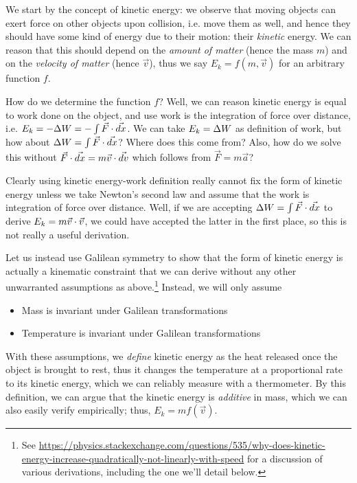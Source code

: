 \documentclass[12pt]{article}
\numberwithin{equation}{section}
\begin{document}
We start by the concept of kinetic energy: we observe that moving objects can exert force on other objects upon collision, i.e. move them as well, and hence they should have some kind of energy due to their motion: their \emph{kinetic} energy. We can reason that this should depend on the \emph{amount of matter} (hence the mass $m$) and on the \emph{velocity of matter} (hence $\vec{v}$), thus we say $E_k=f(m,\vec v)$ for an arbitrary function $f$.

How do we determine the function $f$? Well, we can reason kinetic energy is equal to work done on the object, and use work is the integration of force over distance, i.e. $E_k=-\De W=-\int\vec{F}\.\vec{dx}$. We can take $E_k=\De W$ as definition of work, but how about $\De W=\int\vec{F}\.\vec{dx}$? Where does this come from? Also, how do we solve this without $\vec{F}\.\vec{dx}=m\vec{v}\.\vec{dv}$ which follows from $\vec{F}=m\vec{a}$? 

Clearly using kinetic energy-work definition really cannot fix the form of kinetic energy unless we take Newton's second law and assume that the work is integration of force over distance. Well, if we are accepting $\De W=\int \vec{F}\.\vec{dx}$ to derive $E_k=m\vec{v}\.\vec{v}$, we could have accepted the latter in the first place, so this is not really a useful derivation.

Let us instead use Galilean symmetry to show that the form of kinetic energy is actually a kinematic constraint that we can derive without any other unwarranted assumptions as above.\footnote{
See \hyperref{https://physics.stackexchange.com/questions/535/why-does-kinetic-energy-increase-quadratically-not-linearly-with-speed}{}{}{https://physics.stackexchange.com/questions/535/why-does-kinetic-energy-increase-quadratically-not-linearly-with-speed} for a discussion of various derivations, including the one we'll detail below.
} Instead, we will only assume
\begin{itemize}
	\item Mass is invariant under Galilean transformations
	\item Temperature is  invariant under Galilean transformations
\end{itemize}
With these assumptions, we \emph{define} kinetic energy as the heat released once the object is brought to rest, thus it changes the temperature at a proportional rate to its kinetic energy, which we can reliably measure with a thermometer. By this definition, we can argue that the kinetic energy is \emph{additive} in mass, which we can also easily verify empirically; thus, $E_k=mf(\vec{v})$.
\end{document}
